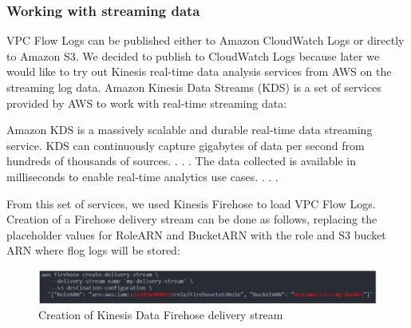         \subsubsection{Working with streaming data} 
        VPC Flow Logs can be published either to Amazon CloudWatch Logs or directly to Amazon S3. We decided to publish to CloudWatch Logs because later we would like to try out Kinesis real-time data analysis services from AWS on the streaming log data. 
        Amazon Kinesis Data Streams (KDS) is a set of services provided by AWS to work with real-time streaming data: 
        \begin{displayquote}
            Amazon KDS is a massively scalable and durable real-time data streaming service. KDS can continuously capture gigabytes of data per second from hundreds of thousands of sources. . . . The data collected is available in milliseconds to enable real-time analytics use cases. . . .\cite{awsKds} 
        \end{displayquote} 
        From this set of services, we used Kinesis Firehose to load VPC Flow Logs. Creation of a Firehose delivery stream can be done as follows, replacing the placeholder values for RoleARN and BucketARN with the role and S3 bucket ARN where flog logs will be stored:
        \begin{figure}[h]
            \centering
            \includegraphics[width=1\textwidth]{images/kinesis-firehose.png}
            \caption{Creation of Kinesis Data Firehose delivery stream}
            \label{fig:kinesis_firehose_delivery}
        \end{figure}
        \FloatBarrier
        
